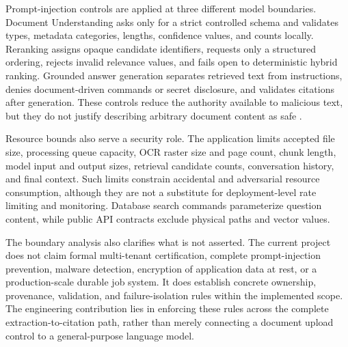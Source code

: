 Prompt-injection controls are applied at three different model boundaries.
Document Understanding asks only for a strict controlled schema and validates
types, metadata categories, lengths, confidence values, and counts locally.
Reranking assigns opaque candidate identifiers, requests only a structured
ordering, rejects invalid relevance values, and fails open to deterministic
hybrid ranking. Grounded answer generation separates retrieved text from
instructions, denies document-driven commands or secret disclosure, and
validates citations after generation. These controls reduce the authority
available to malicious text, but they do not justify describing arbitrary
document content as safe \cite{Abdelnabi2023IndirectPromptInjection,OWASPPromptInjection}.

Resource bounds also serve a security role. The application limits accepted
file size, processing queue capacity, OCR raster size and page count, chunk
length, model input and output sizes, retrieval candidate counts, conversation
history, and final context. Such limits constrain accidental and adversarial
resource consumption, although they are not a substitute for deployment-level
rate limiting and monitoring. Database search commands parameterize question
content, while public API contracts exclude physical paths and vector values.

\enlargethispage{\baselineskip}
The boundary analysis also clarifies what is not asserted. The current project
does not claim formal multi-tenant certification, complete prompt-injection
prevention, malware detection, encryption of application data at rest, or a
production-scale durable job system. It does establish concrete ownership,
provenance, validation, and failure-isolation rules within the implemented
scope. The engineering contribution lies in enforcing these rules
across the complete extraction-to-citation path, rather than merely connecting
a document upload control to a general-purpose language model.
